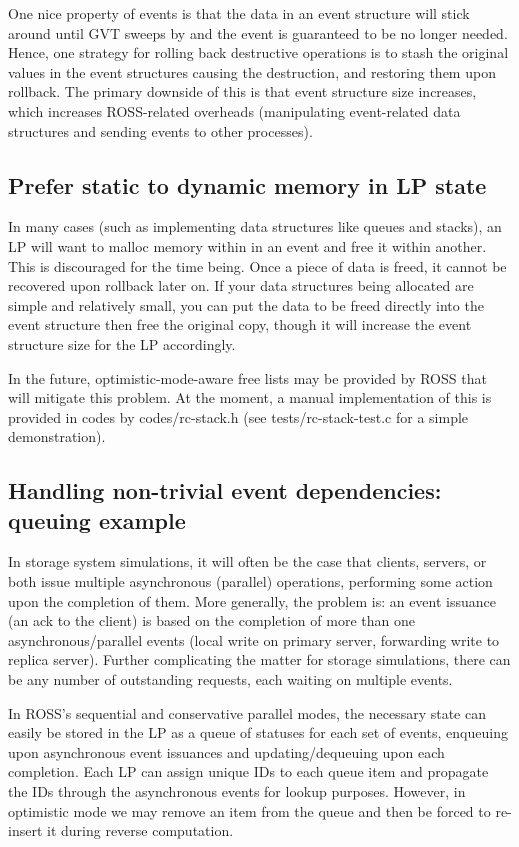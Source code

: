 \documentclass[conference,10pt,compsocconf,onecolumn]{IEEEtran}
\begin{document}
One nice property of events is that the data in an event structure will stick
around until GVT sweeps by and the event is guaranteed to be no longer needed.
Hence, one strategy for rolling back destructive operations is to stash the
original values in the event structures causing the destruction, and restoring
them upon rollback. The primary downside of this is that event structure size
increases, which increases ROSS-related overheads (manipulating event-related
data structures and sending events to other processes).

\subsection{Prefer static to dynamic memory in LP state}

In many cases (such as implementing data structures like queues and stacks), an
LP will want to malloc memory within in an event and free it within another.
This is discouraged for the time being. Once a piece of data is freed, it
cannot be recovered upon rollback later on. If your data structures being
allocated are simple and relatively small, you can put the data to be freed
directly into the event structure then free the original copy, though it will
increase the event structure size for the LP accordingly.

In the future, optimistic-mode-aware free lists may be provided by ROSS that
will mitigate this problem. At the moment, a manual implementation of this is
provided in codes by codes/rc-stack.h (see tests/rc-stack-test.c for a
simple demonstration).

\subsection{Handling non-trivial event dependencies: queuing example}

In storage system simulations, it will often be the case that clients, servers,
or both issue multiple asynchronous (parallel) operations, performing some
action upon the completion of them. More generally, the problem is: an event
issuance (an ack to the client) is based on the completion of more than one
asynchronous/parallel events (local write on primary server, forwarding write to
replica server). Further complicating the matter for storage simulations, there
can be any number of outstanding requests, each waiting on multiple events. 

In ROSS's sequential and conservative parallel modes, the necessary state can
easily be stored in the LP as a queue of statuses for each set of events,
enqueuing upon asynchronous event issuances and updating/dequeuing upon each
completion. Each LP can assign unique IDs to each queue item and propagate the
IDs through the asynchronous events for lookup purposes. However, in optimistic
mode we may remove an item from the queue and then be forced to re-insert it
during reverse computation.
\end{document}
